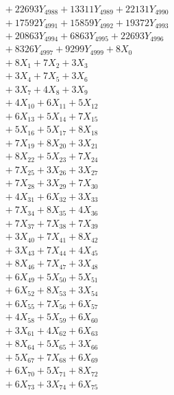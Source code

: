 \documentclass[a4paper,10pt]{article}
\begin{document}
{\begin{align}
&\;  + 22693 Y_{4988} + 13311 Y_{4989} + 22131 Y_{4990} \\[0.3ex]
&\;  + 17592 Y_{4991} + 15859 Y_{4992} + 19372 Y_{4993} \\[0.3ex]
&\;  + 20863 Y_{4994} + 6863 Y_{4995} + 22693 Y_{4996} \\[0.3ex]
&\;  + 8326 Y_{4997} + 9299 Y_{4999} + 8 X_{0} \\[0.3ex]
&\;  + 8 X_{1} + 7 X_{2} + 3 X_{3} \\[0.3ex]
&\;  + 3 X_{4} + 7 X_{5} + 3 X_{6} \\[0.3ex]
&\;  + 3 X_{7} + 4 X_{8} + 3 X_{9} \\[0.5ex]\allowbreak
&\;  + 4 X_{10} + 6 X_{11} + 5 X_{12} \\[0.3ex]
&\;  + 6 X_{13} + 5 X_{14} + 7 X_{15} \\[0.3ex]
&\;  + 5 X_{16} + 5 X_{17} + 8 X_{18} \\[0.3ex]
&\;  + 7 X_{19} + 8 X_{20} + 3 X_{21} \\[0.3ex]
&\;  + 8 X_{22} + 5 X_{23} + 7 X_{24} \\[0.3ex]
&\;  + 7 X_{25} + 3 X_{26} + 3 X_{27} \\[0.3ex]
&\;  + 7 X_{28} + 3 X_{29} + 7 X_{30} \\[0.3ex]
&\;  + 4 X_{31} + 6 X_{32} + 3 X_{33} \\[0.3ex]
&\;  + 7 X_{34} + 8 X_{35} + 4 X_{36} \\[0.3ex]
&\;  + 7 X_{37} + 7 X_{38} + 7 X_{39} \\[0.5ex]\allowbreak
&\;  + 3 X_{40} + 7 X_{41} + 8 X_{42} \\[0.3ex]
&\;  + 3 X_{43} + 7 X_{44} + 4 X_{45} \\[0.3ex]
&\;  + 8 X_{46} + 7 X_{47} + 3 X_{48} \\[0.3ex]
&\;  + 6 X_{49} + 5 X_{50} + 5 X_{51} \\[0.3ex]
&\;  + 6 X_{52} + 8 X_{53} + 3 X_{54} \\[0.3ex]
&\;  + 6 X_{55} + 7 X_{56} + 6 X_{57} \\[0.3ex]
&\;  + 4 X_{58} + 5 X_{59} + 6 X_{60} \\[0.3ex]
&\;  + 3 X_{61} + 4 X_{62} + 6 X_{63} \\[0.3ex]
&\;  + 8 X_{64} + 5 X_{65} + 3 X_{66} \\[0.3ex]
&\;  + 5 X_{67} + 7 X_{68} + 6 X_{69} \\[0.5ex]\allowbreak
&\;  + 6 X_{70} + 5 X_{71} + 8 X_{72} \\[0.3ex]
&\;  + 6 X_{73} + 3 X_{74} + 6 X_{75} \\[0.3ex]

\end{align}}
\end{document}
